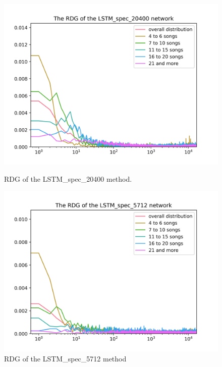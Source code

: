 \begin{figure}[h]
\centering
\begin{minipage}{.45\textwidth}
  \centering
  \includegraphics[width=1\linewidth]{./img/lstm_spec_20400_graph.png}
  \caption[RDG of the LSTM\_spec\_20400 method]{RDG of the \newline LSTM\_spec\_20400 method.}
  \label{fig:lstm_spec_20400_distribution}
\end{minipage}
 \vspace{1cm}
\begin{minipage}{.45\textwidth}
  \centering
  \includegraphics[width=1\linewidth]{./img/lstm_spec_5712_graph.png}
  \caption[RDG of the LSTM\_spec\_5712 method]{RDG of the \newline LSTM\_spec\_5712 method}
  \label{fig:lstm_spec_5712_distribution}
\end{minipage}
\end{figure}\label{fig:lstm_spec_distributions}

